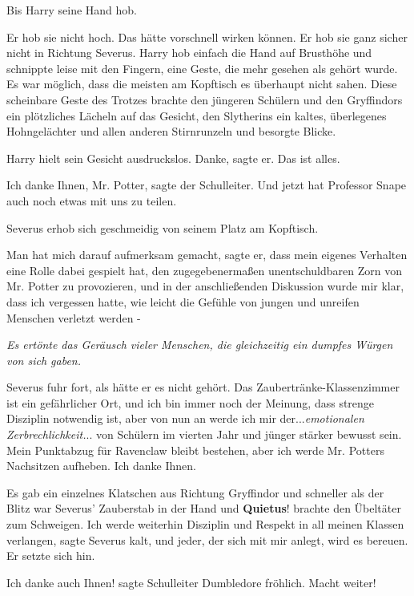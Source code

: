 Bis Harry seine Hand hob.

Er hob sie nicht hoch. Das hätte vorschnell wirken können. Er hob sie ganz
sicher nicht in Richtung Severus. Harry hob einfach die Hand auf Brusthöhe und
schnippte leise mit den Fingern, eine Geste, die mehr gesehen als gehört wurde.
Es war möglich, dass die meisten am Kopftisch es überhaupt nicht sahen. Diese
scheinbare Geste des Trotzes brachte den jüngeren Schülern und den Gryffindors
ein plötzliches Lächeln auf das Gesicht, den Slytherins ein kaltes, überlegenes
Hohngelächter und allen anderen Stirnrunzeln und besorgte Blicke.

Harry hielt sein Gesicht ausdruckslos. \glqq Danke\grqq{}, sagte er. \glqq Das
ist alles.\grqq{}

\glqq Ich danke Ihnen, Mr. Potter\grqq{}, sagte der Schulleiter. \glqq Und jetzt
hat Professor Snape auch noch etwas mit uns zu teilen.\grqq{}

Severus erhob sich geschmeidig von seinem Platz am Kopftisch.

\glqq Man hat mich darauf aufmerksam gemacht\grqq{}, sagte er, \glqq dass mein
eigenes Verhalten eine Rolle dabei gespielt hat, den zugegebenermaßen
unentschuldbaren Zorn von Mr. Potter zu provozieren, und in der anschließenden
Diskussion wurde mir klar, dass ich vergessen hatte, wie leicht die Gefühle von
jungen und unreifen Menschen verletzt werden -\grqq{}

\emph{Es ertönte das Geräusch vieler Menschen, die gleichzeitig ein dumpfes
Würgen von sich gaben.}

Severus fuhr fort, als hätte er es nicht gehört. \glqq Das
Zaubertränke-Klassenzimmer ist ein gefährlicher Ort, und ich bin immer noch der
Meinung, dass strenge Disziplin notwendig ist, aber von nun an werde ich mir
der...\emph{emotionalen Zerbrechlichkeit.}.. von Schülern im vierten Jahr und
jünger stärker bewusst sein. Mein Punktabzug für Ravenclaw bleibt bestehen, aber
ich werde Mr. Potters Nachsitzen aufheben. Ich danke Ihnen.\grqq{}

Es gab ein einzelnes Klatschen aus Richtung Gryffindor und schneller als der
Blitz war Severus' Zauberstab in der Hand und \glqq \textbf{Quietus}!\grqq{}
brachte den Übeltäter zum Schweigen. \glqq Ich werde weiterhin Disziplin und
Respekt in all meinen Klassen verlangen\grqq{}, sagte Severus kalt, \glqq und
jeder, der sich mit mir anlegt, wird es bereuen.\grqq{} Er setzte sich hin.

\glqq Ich danke auch Ihnen!\grqq{} sagte Schulleiter Dumbledore fröhlich. \glqq
Macht weiter!\grqq{}

